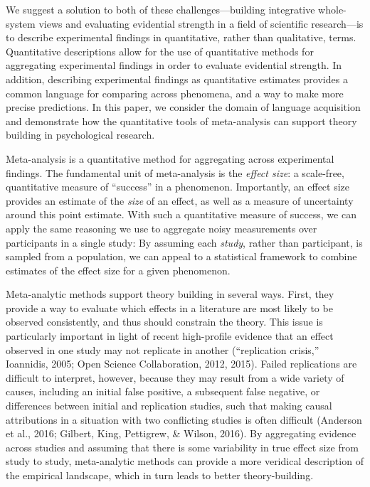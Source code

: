 \documentclass[english,floatsintext,man]{apa6}
\begin{document}
We suggest a solution to both of these challenges---building integrative
whole-system views and evaluating evidential strength in a field of
scientific research---is to describe experimental findings in
quantitative, rather than qualitative, terms. Quantitative descriptions
allow for the use of quantitative methods for aggregating experimental
findings in order to evaluate evidential strength. In addition,
describing experimental findings as quantitative estimates provides a
common language for comparing across phenomena, and a way to make more
precise predictions. In this paper, we consider the domain of language
acquisition and demonstrate how the quantitative tools of meta-analysis
can support theory building in psychological research.

Meta-analysis is a quantitative method for aggregating across
experimental findings. The fundamental unit of meta-analysis is the
\emph{effect size}: a scale-free, quantitative measure of
\enquote{success} in a phenomenon. Importantly, an effect size provides
an estimate of the \emph{size} of an effect, as well as a measure of
uncertainty around this point estimate. With such a quantitative measure
of success, we can apply the same reasoning we use to aggregate noisy
measurements over participants in a single study: By assuming each
\emph{study}, rather than participant, is sampled from a population, we
can appeal to a statistical framework to combine estimates of the effect
size for a given phenomenon.

Meta-analytic methods support theory building in several ways. First,
they provide a way to evaluate which effects in a literature are most
likely to be observed consistently, and thus should constrain the
theory. This issue is particularly important in light of recent
high-profile evidence that an effect observed in one study may not
replicate in another (``replication crisis,'' Ioannidis, 2005; Open
Science Collaboration, 2012, 2015). Failed replications are difficult to
interpret, however, because they may result from a wide variety of
causes, including an initial false positive, a subsequent false
negative, or differences between initial and replication studies, such
that making causal attributions in a situation with two conflicting
studies is often difficult (Anderson et al., 2016; Gilbert, King,
Pettigrew, \& Wilson, 2016). By aggregating evidence across studies and
assuming that there is some variability in true effect size from study
to study, meta-analytic methods can provide a more veridical description
of the empirical landscape, which in turn leads to better
theory-building.
\end{document}
